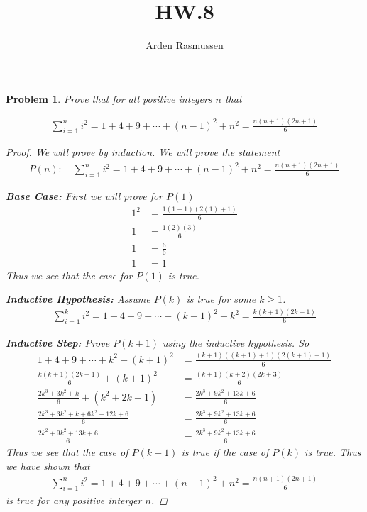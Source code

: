 \documentclass{article}
\title{HW.8}
\author{Arden Rasmussen}
\theoremstyle{problemstyle}
\newtheorem{problem}{Problem}
\begin{document}
\maketitle

\begin{problem}
   
Prove that for all positive integers $n$ that

\begin{align*}
  \sum_{i=1}^{n}i^2=1+4+9+\cdots + {(n-1)}^2+n^2 = \frac{n(n+1)(2n+1)}{6}
\end{align*}

\begin{proof}
  We will prove by induction. We will prove the statement
  \begin{align*}
    P(n):\quad \sum_{i=1}^{n}i^2=1+4+9+\cdots + {(n-1)}^2+n^2 = \frac{n(n+1)(2n+1)}{6}
  \end{align*}
  
  \textbf{Base Case:} First we will prove for $P(1)$
  \begin{align*}
    1^2 &= \frac{1(1+1)(2(1)+1)}{6}\\
    1 &= \frac{1(2)(3)}{6}\\
    1 &= \frac{6}{6}\\
    1 &= 1
  \end{align*}
  Thus we see that the case for $P(1)$ is true.

  \textbf{Inductive Hypothesis:} Assume $P(k)$ is true for some $k\ge1$.
  \begin{align*}
    \sum_{i=1}^{k}i^2=1+4+9+\cdots + {(k-1)}^2+k^2 = \frac{k(k+1)(2k+1)}{6}
  \end{align*}

  \textbf{Inductive Step:} Prove $P(k+1)$ using the \textit{inductive
  hypothesis}. So
  \begin{align*}
    1+4+9+\cdots + k^2+{(k+1)}^2 &= \frac{(k+1)((k+1)+1)(2(k+1)+1)}{6}\\
    \frac{k(k+1)(2k+1)}{6} + {(k+1)}^2 &= \frac{(k+1)(k+2)(2k+3)}{6}\\
    \frac{2k^3+3k^2+k}{6} + \left(k^2+2k+1\right) &= \frac{2k^3+9k^2+13k+6}{6}\\
    \frac{2k^3+3k^2+k+6k^2+12k+6}{6} &= \frac{2k^3+9k^2+13k+6}{6}\\
    \frac{2k^2+9k^2+13k+6}{6} &= \frac{2k^3+9k^2+13k+6}{6}
  \end{align*}
  Thus we see that the case of $P(k+1)$ is true if the case of $P(k)$ is true.
  Thus we have shown that
  \begin{align*}
    \sum_{i=1}^{n}i^2=1+4+9+\cdots + {(n-1)}^2+n^2 = \frac{n(n+1)(2n+1)}{6}
  \end{align*}
  is true for any positive interger $n$.
\end{proof}
\end{problem}
\end{document}
